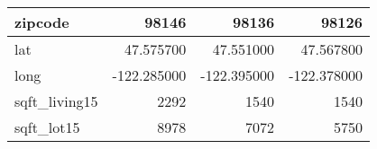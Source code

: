 \begin{table}[H]
\begin{tabular}{|l|r|r|r|}
\hline zipcode & \cellcolor[rgb]{0.9, 0.54, 0.52} 98146 & 98136 & 98126 \\
\hline lat & \cellcolor[rgb]{0.9, 0.54, 0.52} 47.575700 & 47.551000 & 47.567800 \\
\hline long & \cellcolor[rgb]{0.9, 0.54, 0.52} -122.285000 & \cellcolor[rgb]{0.9, 0.54, 0.52} -122.395000 & \cellcolor[rgb]{0.9, 0.54, 0.52} -122.378000 \\
\hline sqft\_living15 & \cellcolor[rgb]{0.9, 0.54, 0.52} 2292 & 1540 & 1540 \\
\hline sqft\_lot15 & \cellcolor[rgb]{0.9, 0.54, 0.52} 8978 & 7072 & 5750 \\
\hline
\end{tabular}
\end{table}
